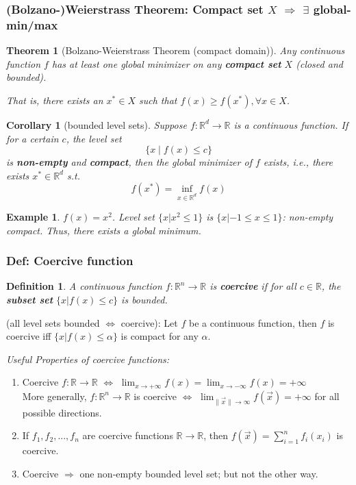 \documentclass[11pt,a4paper]{article}
\newtheorem{theorem}{Theorem}
\newtheorem{example}{Example}
\newtheorem{corollary}{Corollary}
\newtheorem{definition}{Definition}
\begin{document}
\subsubsection{(Bolzano-)Weierstrass Theorem: Compact set $X$ $\Rightarrow$ $\exists$ global-min/max} 
\begin{theorem}[Bolzano-Weierstrass Theorem (compact domain)]
    Any continuous function $f$ has at least one global minimizer on any \textbf{compact set} $X$ (closed and bounded).

    That is, there exists an $x^{*} \in X$ such that $f(x) \geq f\left(x^{*}\right), \forall x \in X$.
\end{theorem}

\begin{corollary}[bounded level sets]
    Suppose $f: \mathbb{R}^{d} \rightarrow \mathbb{R}$ is a continuous function. If for a certain $c$, the level set
    $$
    \{x \mid f(x) \leq c\}
    $$
    is \textbf{non-empty} and \textbf{compact}, then the global minimizer of $f$ exists, i.e., there exists $x^{*} \in \mathbb{R}^{d}$ s.t.
    $$
    f\left(x^{*}\right)=\inf _{x \in \mathbb{R}^{d}} f(x)
    $$
\end{corollary}
\begin{example}
    $f(x) = x^2$.
    Level set $\{x|x^2 \leq 1\}$ is $\{x|-1\leq x\leq 1\}$: non-empty compact. Thus, there exists a global minimum.
\end{example}
\subsubsection{Def: Coercive function}
\begin{definition}
    A continuous function $f: \mathbb{R}^n \rightarrow \mathbb{R}$ is \textbf{coercive} if for all $c\in \mathbb{R}$, the \textbf{subset set} $\{x | f(x) \leq c\}$ is bounded.
\end{definition}
(all level sets bounded $\Leftrightarrow$ coercive): Let $f$ be a continuous function, then $f$ is coercive iff $\{x | f(x) \leq \alpha\}$ is compact for any $\alpha$.

\textit{Useful Properties of coercive functions:}
\begin{enumerate}[$\bullet$]
    \item Coercive $f: \mathbb{R} \rightarrow \mathbb{R}$ $\Leftrightarrow$ $\lim_{x \rightarrow +\infty}f(x)=\lim_{x \rightarrow -\infty}f(x)=+\infty$\\
    More generally, $f: \mathbb{R}^n \rightarrow  \mathbb{R}$ is coercive $\Leftrightarrow$ $\lim_{\|\vec{x}\| \rightarrow \infty}f(\vec{x})=+\infty$ for all possible directions.
    \item If $f_1,f_2,...,f_n$ are coercive functions $\mathbb{R} \rightarrow  \mathbb{R}$, then $f(\vec{x})=\sum_{i=1}^n f_i(x_i)$ is coercive.
    \item Coercive $\Rightarrow$ one non-empty bounded level set; but not the other way.
\end{enumerate}
\end{document}
